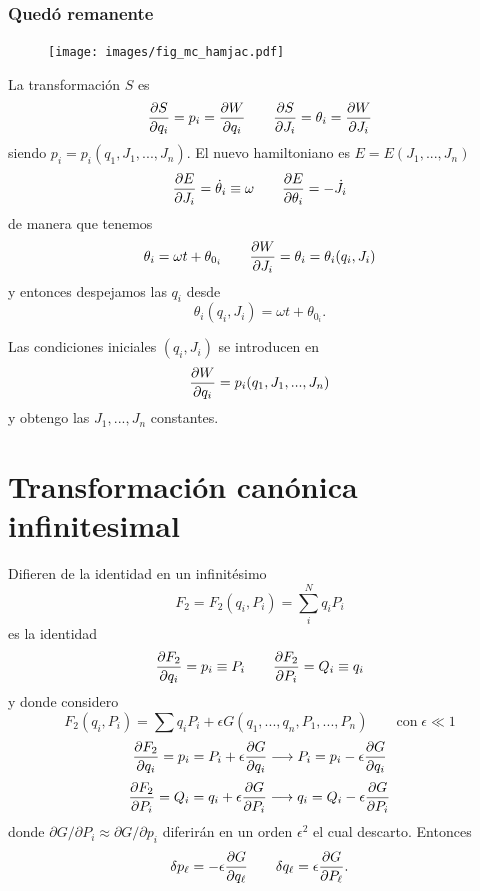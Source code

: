 \documentclass[10pt,oneside]{CBFT_book}
\begin{document}
\subsubsection{Quedó remanente}

\begin{figure}
	\begin{center}
	\texttt{[image: images/fig\_mc\_hamjac.pdf]}	 
	\end{center}
	\caption{}
\end{figure} 


La transformación $S$ es 
\[
	\dpar{S}{q_i} = p_i = \dpar{W}{q_i} \qquad \dpar{S}{J_i} = \theta_i = \dpar{W}{J_i}
\]
siendo $p_i = p_i(q_1,J_1,...,J_n)$.
El nuevo hamiltoniano es $E=E(J_1,...,J_n)$
\[
	\dpar{E}{J_i} = \dot{\theta}_i \equiv \omega \qquad \dpar{E}{\theta_i} = -\dot{J}_i
\]
de manera que tenemos
\[
	\theta_i = \omega t + \theta_{0_i} \qquad  \dpar{W}{J_i} = \theta_i = \theta_i(q_i, J_i)
\]
y entonces despejamos las $q_i$ desde
\[
	\theta_i(q_i, J_i) = \omega t + \theta_{0_i}.
\]

Las condiciones iniciales $(q_i, J_i)$ se introducen en
\[
	\dpar{W}{q_i} = p_i(q_1,J_1,...,J_n)
\]
y obtengo las $J_1, ..., J_n$ constantes.

\section{Transformación canónica infinitesimal}

Difieren de la identidad en un infinitésimo
\[
	F_2 = 	F_2(q_i,P_i) = \sum_i^N q_iP_i
\]
es la identidad
\[
	\dpar{F_2}{q_i} =  p_i \equiv P_i \qquad \dpar{F_2}{P_i} =  Q_i \equiv q_i
\]
y donde considero
\[
	F_2(q_i,P_i) = \sum q_i P_i + \epsilon G(q_1,...,q_n,P_1,...,P_n) \qquad \textrm{con} \; \epsilon \ll 1
\]
\[
	\dpar{F_2}{q_i} = p_i = P_i + \epsilon\dpar{G}{q_i} \longrightarrow P_i = p_i - \epsilon\dpar{G}{q_i} 
\]
\[
	\dpar{F_2}{P_i} = Q_i = q_i + \epsilon\dpar{G}{P_i} \longrightarrow q_i = Q_i - \epsilon\dpar{G}{P_i} 	
\]
donde $\partial G/\partial P_i \approx \partial G/\partial p_i$ diferirán en un orden $\epsilon^2$ el cual
descarto. Entonces
\[
	\delta p_\ell = -\epsilon \dpar{G}{q_\ell} \qquad \delta q_\ell = \epsilon \dpar{G}{P_\ell}.
\]
\end{document}
